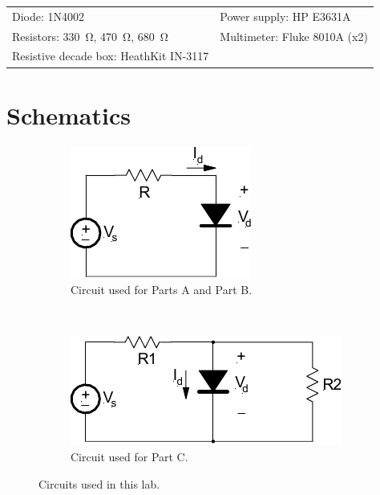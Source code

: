 \documentclass{article}
\begin{document}
\begin{tabular}{ll}
  \centering
  Diode: 1N4002 & Power supply: HP E3631A \\
  Resistors: \SI{330}{\ohm}, \SI{470}{\ohm}, \SI{680}{\ohm} & Multimeter: Fluke 8010A (x2)\\
  Resistive decade box: HeathKit IN-3117 & \\
\end{tabular}

\section{Schematics}
\label{sec:schematics}

\begin{figure}[hbtp]
  \centering
  \begin{subfigure}[b]{0.4\textwidth}
    \includegraphics[width=\textwidth]{img/circuit1}
    \caption{\label{fig:circuit1} Circuit used for Parts A and Part B.}
  \end{subfigure}%
  ~
  \begin{subfigure}[b]{0.6\textwidth}
    \includegraphics[width=\textwidth]{img/circuit2}
    \caption{\label{fig:circuit2} Circuit used for Part C.}
  \end{subfigure}
  \caption{\label{fig:circuits_tested} Circuits used in this lab.}
\end{figure}
\end{document}
